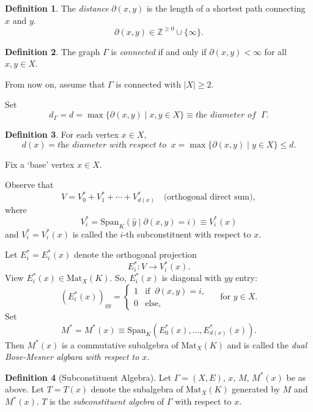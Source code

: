 \documentclass[
]{book}
\theoremstyle{definition}
\newtheorem{definition}{Definition}[chapter]
\theoremstyle{definition}
\theoremstyle{definition}
\theoremstyle{definition}
\theoremstyle{remark}
\begin{document}
\begin{definition}
\protect\hypertarget{def:distance}{}\label{def:distance}The \emph{distance} \(\partial(x,y)\) is the length of a shortest path connecting \(x\) and \(y\).
\[\partial(x,y) \in \mathbb{Z}^{\geq 0} \cup \{\infty\}.\]
\end{definition}

\begin{definition}
\protect\hypertarget{def:connected}{}\label{def:connected}The graph \(\Gamma\) is \emph{connected} if and only if \(\partial(x,y) < \infty\) for all \(x, y\in X\).

From now on, assume that \(\Gamma\) is connected with \(|X|\geq 2\).

Set 
\[d_\Gamma = d = \max\{\partial(x,y)\mid x, y\in X\} \equiv \textit{the diameter of }\;\Gamma.\]
\end{definition}

\begin{definition}
\protect\hypertarget{def:diameter}{}\label{def:diameter}For each vertex \(x\in X\), 
\[d(x) = \textit{the diameter with respect to }\: x = \max\{\partial(x,y)\mid y\in X\} \leq d.\]
\end{definition}

Fix a `base' vertex \(x\in X\).

Observe that
\[V = V_0^* + V_1^* + \cdots + V_{d(x)}^* \quad \textrm{(orthogonal direct sum)},\]
where
\[V_i^* = \mathrm{Span}_K(\hat{y}\mid \partial(x,y) = i) \equiv V_i^*(x)\]
and \(V_i^* = V_i^*(x)\) is called the \(i\)-th subconstituent with respect to \(x\).

Let \(E_i^* = E_i^*(x)\) denote the orthogonal projection
\[E_i^*: V \longrightarrow V_i^*(x).\]
View \(E_i^*(x) \in \mathrm{Mat}_X(K)\). So, \(E_i^*(x)\) is diagonal with \(yy\) entry:
\[(E_i^*(x))_{yy} = \begin{cases} 1 & \textrm{if } \: \partial(x,y) = i,\\ 0 & \textrm{else,}\end{cases} \quad \textrm{ for } y\in X.\]
Set
\[M^* = M^*(x) \equiv \textrm{Span}_K(E_0^*(x), \ldots, E_{d(x)}^*(x)).\]
Then \(M^*(x)\) is a commutative subalgebra of \(\mathrm{Mat}_X(K)\) and is called the \emph{dual Bose-Mesner algbara with respect to \(x\)}.

\begin{definition}[Subconstituent Algebra]
\protect\hypertarget{def:t-algebra}{}\label{def:t-algebra}Let \(\Gamma = (X, E)\), \(x\), \(M\), \(M^*(x)\) be as above. Let \(T = T(x)\) denote the subalgebra of \(\mathrm{Mat}_X(K)\) generated by \(M\) and \(M^*(x)\). \(T\) is the \emph{subconstituent algebra} of \(\Gamma\) with respect to \(x\).
\end{definition}
\end{document}
